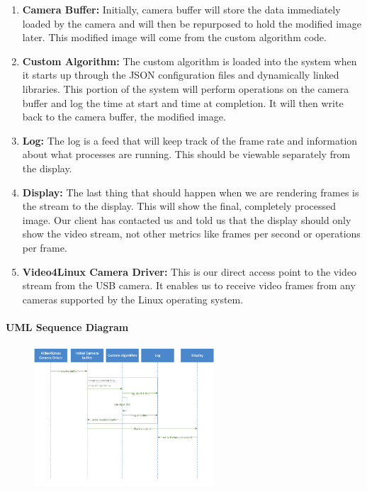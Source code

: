	\begin{enumerate}[leftmargin=2cm,labelindent=2cm]
	\item \textbf{Camera Buffer:}
	Initially, camera buffer will store the data immediately loaded by the camera and will then be repurposed to hold the modified image later. This 		modified image will come from the custom algorithm code.

	\item \textbf{Custom Algorithm:}
	The custom algorithm is loaded into the system when it starts up through the JSON configuration files and dynamically linked libraries. This 		portion of the system will perform operations on the camera buffer and log the time at start and time at completion. It will then write back to the 		camera buffer, the modified image.

	\item \textbf{Log:}
	The log is a feed that will keep track of the frame rate and information about what processes are running. This should be viewable separately from 	the display.

	\item \textbf{Display:}
	The last thing that should happen when we are rendering frames is the stream to the display. This will show the final, completely processed 		image. Our client has contacted us and told us that the display should only show the video stream, not other metrics like frames per second or 		operations per frame.

	\item \textbf{Video4Linux Camera Driver:}
	This is our direct access point to the video stream from the USB camera. It enables us to receive video frames from any cameras supported by 	the Linux operating system.\\
	\end{enumerate}
	
	\paragraph{UML Sequence Diagram}
	\begin{figure}[H] 
		\centering
		\includegraphics[width=0.6\textwidth,natwidth=610,natheight=642]{images/UML_Diagram.png}  
		\end{figure}
	
